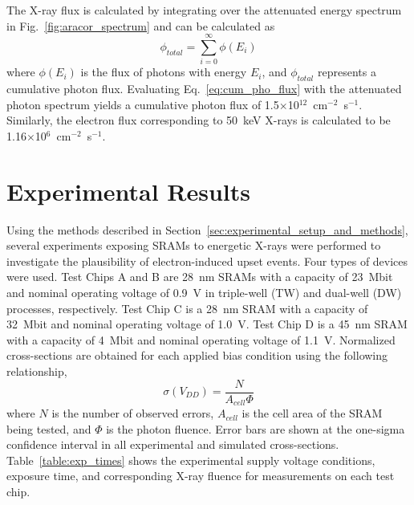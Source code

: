 The X-ray flux is calculated by integrating over the attenuated energy spectrum in Fig.~\ref{fig:aracor_spectrum} and can be calculated as
\begin{equation}
    \label{eq:cum_pho_flux}
    \phi_{total} = \sum_{i=0}^{\infty} \phi(E_{i})
\end{equation}
where $\phi(E_{i})$ is the flux of photons with energy $E_{i}$, and $\phi_{total}$ represents a cumulative photon flux. 
Evaluating Eq.~\ref{eq:cum_pho_flux} with the attenuated photon spectrum yields a cumulative photon flux of 1.5$\times$10$^{12}$~cm$^{-2}$~s$^{-1}$.
Similarly, the electron flux corresponding to 50~keV X-rays is calculated to be 1.16$\times$10$^{6}$~cm$^{-2}$~s$^{-1}$.

\section{Experimental Results} %
\label{sec:experimental_results}
Using the methods described in Section~\ref{sec:experimental_setup_and_methods}, several experiments exposing SRAMs to energetic X-rays were performed to investigate the plausibility of electron-induced upset events. 
Four types of devices were used. 
Test Chips A and B are 28~nm SRAMs with a capacity of 23~Mbit and nominal operating voltage of 0.9~V in triple-well (TW) and dual-well (DW) processes, respectively. 
Test Chip C is a 28~nm SRAM with a capacity of 32~Mbit and nominal operating voltage of 1.0~V. 
Test Chip D is a 45~nm SRAM with a capacity of 4~Mbit and nominal operating voltage of 1.1~V. 
Normalized cross-sections are obtained for each applied bias condition using the following relationship,
\begin{equation}
    \label{eq:norm_cs}
    \sigma(V_{DD}) = \frac{N}{A_{cell} \Phi}
\end{equation}
where $N$ is the number of observed errors, $A_{cell}$ is the cell area of the SRAM being tested, and $\Phi$ is the photon fluence. 
Error bars are shown at the one-sigma confidence interval in all experimental and simulated cross-sections.
Table~\ref{table:exp_times} shows the experimental supply voltage conditions, exposure time, and corresponding X-ray fluence for measurements on each test chip.

